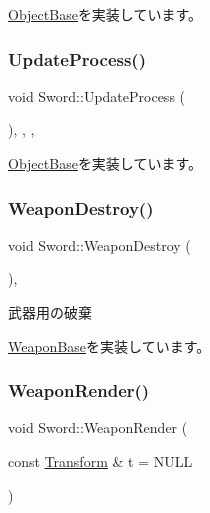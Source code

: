 \mbox{\hyperlink{class_object_base_aeac51d868beeb7f7fe900407b76b93a2}{Object\+Base}}を実装しています。

\mbox{\label{class_sword_a3e0221aa5c05ecada9def39fb38c0059}} 
\subsubsection{\texorpdfstring{Update\+Process()}{UpdateProcess()}}
{\footnotesize\ttfamily void Sword\+::\+Update\+Process (\begin{DoxyParamCaption}{ }\end{DoxyParamCaption})\hspace{0.3cm}{\ttfamily [inline]}, {\ttfamily [final]}, {\ttfamily [protected]}, {\ttfamily [virtual]}}



\mbox{\hyperlink{class_object_base_a8b5b72b363a419767efde0b0e692ea95}{Object\+Base}}を実装しています。

\mbox{\label{class_sword_a3f60d8b24b7847d6a84f0941820b711d}} 
\subsubsection{\texorpdfstring{Weapon\+Destroy()}{WeaponDestroy()}}
{\footnotesize\ttfamily void Sword\+::\+Weapon\+Destroy (\begin{DoxyParamCaption}{ }\end{DoxyParamCaption})\hspace{0.3cm}{\ttfamily [final]}, {\ttfamily [virtual]}}



武器用の破棄 



\mbox{\hyperlink{class_weapon_base_a417784a8c8bf73cd398a77b922fc110c}{Weapon\+Base}}を実装しています。

\mbox{\label{class_sword_aba05706b8b2480a8317595f92a7bc5ce}} 
\subsubsection{\texorpdfstring{Weapon\+Render()}{WeaponRender()}}
{\footnotesize\ttfamily void Sword\+::\+Weapon\+Render (\begin{DoxyParamCaption}\item[{const \mbox{\hyperlink{class_transform}{Transform}} \&}]{t = {\ttfamily NULL} }\end{DoxyParamCaption})\hspace{0.3cm}{\ttfamily [virtual]}}



